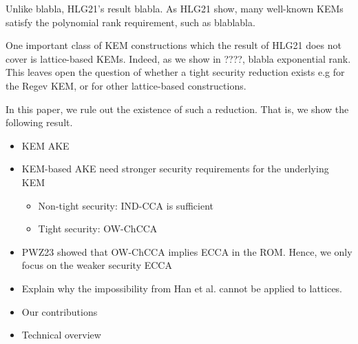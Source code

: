 Unlike blabla, HLG21's result blabla.
As HLG21 show, many well-known KEMs satisfy the polynomial rank requirement, such as blablabla.

One important class of KEM constructions which the result of HLG21 does not cover is lattice-based KEMs.
Indeed, as we show in ????, blabla exponential rank.
This leaves open the question of whether a tight security reduction exists e.g for the Regev KEM,
or for other lattice-based constructions.

In this paper, we rule out the existence of such a reduction.
That is, we show the following result.




\begin{itemize}
	\item KEM AKE
	\item KEM-based AKE need stronger security requirements for the underlying KEM
	\begin{itemize}
		\item Non-tight security:  IND-CCA is sufficient
		\item Tight security: OW-ChCCA
	\end{itemize}
	\item PWZ23 showed that OW-ChCCA implies ECCA in the ROM. Hence, we only focus on the weaker security ECCA 
	\item Explain why the impossibility from Han et al. cannot be applied to lattices.
	\item Our contributions
	\item Technical overview
\end{itemize}




